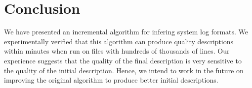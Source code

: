 \section{Conclusion}
\label{sec:conclude}
We have presented an incremental algorithm for infering system log
formats.  We experimentally verified that this algorithm can produce
quality descriptions within minutes when run on files with hundreds of
thousands of lines.  Our experience suggests that the quality of
the final description is very sensitive to the quality of the initial
description.  Hence, we intend to work in the future on improving the
original algorithm to produce  better initial descriptions. 



 

